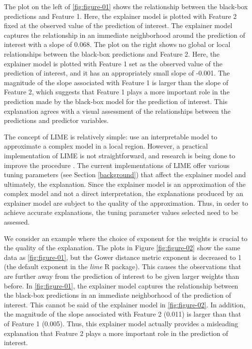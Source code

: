 \documentclass[AMS,STIX2COL]{WileyNJD-v2}\usepackage[]{graphicx}\usepackage[]{color}
\begin{document}
The plot on the left of \autoref{fig:figure-01} shows the relationship between the black-box predictions and Feature 1. Here, the explainer model is plotted with Feature 2 fixed at the observed value of the prediction of interest. The explainer model captures the relationship in an  immediate neighborhood around the prediction of interest with a slope of 0.068. The plot on the right shows no global or local relationships between the black-box predictions and Feature 2. Here, the explainer model is plotted with Feature 1 set as the observed value of the prediction of interest, and it has an appropriately small slope of -0.001. The magnitude of the slope associated with Feature 1 is larger than the slope of Feature 2, which suggests that Feature 1 plays a more important role in the prediction made by the black-box model for the prediction of interest. This explanation agrees with a visual assessment of the relationships between the predictions and predictor variables.

The concept of LIME is relatively simple: use an interpretable model to approximate a complex model in a local region. However, a practical implementation of LIME is not straightforward, and research is being done to improve the procedure \citep{laugel:2018}. The current implementations of LIME \citep{ribeiro:2020} \citep{pedersen:2020} offer various tuning parameters (see Section \ref{background}) that affect the explainer model and ultimately, the explanation. Since the explainer model is an approximation of the complex model and not a direct interpretation, the explanations produced by an explainer model are subject to the quality of the approximation. Thus, in order to achieve accurate explanations, the tuning parameter values selected need to be assessed. 

We consider an example where the choice of exponent for the weights is crucial to the quality of the explanation. The plots in Figure \ref{fig:figure-02} show the same data as \autoref{fig:figure-01}, but the Gower distance metric exponent is decreased to 1 (the default exponent in the \emph{lime} R package). This causes the observations that are further away from the prediction of interest to be given larger weights than before. In \autoref{fig:figure-01}, the explainer model captures the relationship between the black-box predictions in an immediate neighborhood of the prediction of interest. This cannot be said of the explainer model in \autoref{fig:figure-02}. In addition, the magnitude of the slope associated with Feature 2  (0.011) is larger than that of Feature 1 (0.005). Thus, this explainer model actually provides a misleading explanation that Feature 2 plays a more important role in the prediction of interest.
\end{document}
